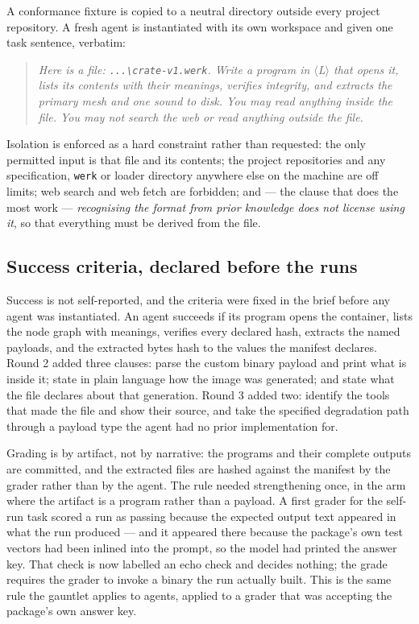 \documentclass[10pt,twocolumn,letterpaper]{article}
\newcommand{\code}[1]{\texttt{\small #1}}
\begin{document}
A conformance fixture is copied to a neutral directory outside every project repository. A fresh agent is instantiated with its own workspace and given one task sentence, verbatim:

\begin{quote}\small\itshape
Here is a file: \code{...\textbackslash{}crate-v1.werk}. Write a program in $\langle$L$\rangle$ that opens it, lists its contents with their meanings, verifies integrity, and extracts the primary mesh and one sound to disk. You may read anything inside the file. You may not search the web or read anything outside the file.
\end{quote}

Isolation is enforced as a hard constraint rather than requested: the only permitted input is that file and its contents; the project repositories and any specification, \code{werk} or loader directory anywhere else on the machine are off limits; web search and web fetch are forbidden; and --- the clause that does the most work --- \emph{recognising the format from prior knowledge does not license using it}, so that everything must be derived from the file.

\subsection{Success criteria, declared before the runs}

Success is not self-reported, and the criteria were fixed in the brief before any agent was instantiated. An agent succeeds if its program opens the container, lists the node graph with meanings, verifies every declared hash, extracts the named payloads, and the extracted bytes hash to the values the manifest declares. Round 2 added three clauses: parse the custom binary payload and print what is inside it; state in plain language how the image was generated; and state what the file declares about that generation. Round 3 added two: identify the tools that made the file and show their source, and take the specified degradation path through a payload type the agent had no prior implementation for.

Grading is by artifact, not by narrative: the programs and their complete outputs are committed, and the extracted files are hashed against the manifest by the grader rather than by the agent. The rule needed strengthening once, in the arm where the artifact is a program rather than a payload. A first grader for the self-run task scored a run as passing because the expected output text appeared in what the run produced --- and it appeared there because the package's own test vectors had been inlined into the prompt, so the model had printed the answer key. That check is now labelled an echo check and decides nothing; the grade requires the grader to invoke a binary the run actually built. This is the same rule the gauntlet applies to agents, applied to a grader that was accepting the package's own answer key.
\end{document}
